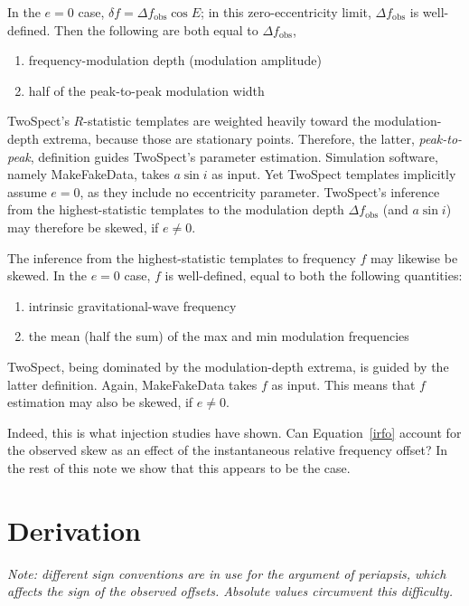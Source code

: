 \documentclass{article}
\begin{document}
In the $e = 0$ case, $\delta f = \Delta f_\mathrm{obs} \cos E$; in this zero-eccentricity limit, $\Delta f_\mathrm{obs}$ is well-defined. 
Then the following are both equal to $\Delta f_\mathrm{obs}$,

\begin{enumerate}
\item frequency-modulation depth (modulation amplitude)
\item half of the peak-to-peak modulation width 
\end{enumerate}

TwoSpect's $R$-statistic templates are weighted heavily toward the modulation-depth extrema, because those are stationary points.
Therefore, the latter, \textit{peak-to-peak}, definition guides TwoSpect's parameter estimation.
Simulation software, namely MakeFakeData, takes $a \sin i$ as input.
Yet TwoSpect templates implicitly assume $e=0$, as they include no eccentricity parameter.
TwoSpect's inference from the highest-statistic templates to the modulation depth $\Delta f_\mathrm{obs}$ (and $a \sin i$) may therefore be skewed, if $e \neq 0$. 
 
The inference from the highest-statistic templates to frequency $f$ may likewise be skewed.
In the $e=0$ case, $f$ is well-defined, equal to both the following quantities:

\begin{enumerate}
\item intrinsic gravitational-wave frequency
\item the mean (half the sum) of the max and min modulation frequencies
\end{enumerate}

TwoSpect, being dominated by the modulation-depth extrema, is guided by the latter definition.
Again, MakeFakeData takes $f$ as input.
This means that $f$ estimation may also be skewed, if $e \neq 0$.

Indeed, this is what injection studies have shown. 
Can Equation~\ref{irfo} account for the observed skew as an effect of the instantaneous relative frequency offset?
In the rest of this note we show that this appears to be the case.

\section{Derivation}

\textit{Note: different sign conventions are in use for the argument of periapsis, which affects the sign of the observed offsets. 
Absolute values circumvent this difficulty.}
\end{document}
